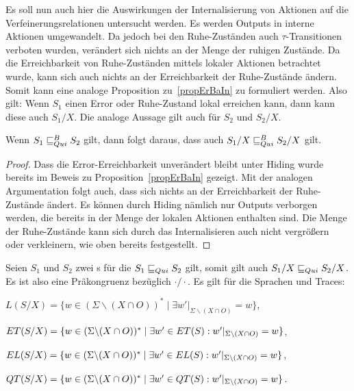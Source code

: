 Es soll nun auch hier die Auswirkungen der Internalisierung von Aktionen auf
die Verfeinerungsrelationen untersucht werden. Es werden Outputs in interne
Aktionen umgewandelt. Da jedoch bei den Ruhe-Zuständen auch
$\tau$-Transitionen verboten wurden, verändert sich nichts an der Menge der
ruhigen Zustände. Da die Erreichbarkeit von Ruhe-Zuständen mittels lokaler
Aktionen betrachtet wurde, kann sich auch nichts an der Erreichbarkeit der
Ruhe-Zustände ändern. Somit kann eine analoge Proposition zu~\ref{propErBaIn}
zu formuliert werden. Also gilt: Wenn $S_1$ einen Error oder Ruhe-Zustand lokal
erreichen kann, dann kann diese auch $S_1/X$. Die analoge Aussage gilt auch für
$S_2$ und $S_2/X$.

\begin{prop}
  Wenn $S_1\sqsubseteq _{Qui}^B S_2$ gilt, dann folgt daraus, dass auch $S_1/X\sqsubseteq _{Qui}^B S_2/X$
  gilt.
\end{prop}

\begin{proof}
  Dass die Error-Erreichbarkeit unverändert bleibt unter Hiding wurde bereits
  im Beweis zu Proposition~\ref{propErBaIn} gezeigt. Mit der analogen
  Argumentation folgt auch, dass sich nichts an der Erreichbarkeit der
  Ruhe-Zustände ändert. Es können durch Hiding nämlich nur Outputs verborgen
  werden, die bereits in der Menge der lokalen Aktionen enthalten sind. Die
  Menge der Ruhe-Zustände kann sich durch das Internalisieren auch nicht
  vergrößern oder verkleinern, wie oben bereits festgestellt.
\end{proof}

\begin{satz}
  \label{satzPraeInterQui}
  Seien $S_1$ und $S_2$ zwei \EIO{}s für die $S_1\sqsubseteq _{Qui} S_2$ gilt, somit gilt
  auch $S_1/X\sqsubseteq _{Qui} S_2/X$. Es ist also \QRel{} eine Präkongruenz bezüglich
  $\cdot /\cdot$. Es gilt für die Sprachen und Traces:
  \begin{compactenum}[(i)]
    \item $L(S/X) = \{w\in (\Sigma\backslash(X\cap O))^*\mid \exists
      w'|_{\Sigma\backslash (X\cap O)} = w\}$,
    \item $ET{}(S/X) = \{w\in (\Sigma\backslash (X\cap O))^*\mid \exists
      w'\in ET{}(S): w'|_{\Sigma\backslash (X\cap O)} = w\}$,
    \item $EL{}(S/X) = \{w\in (\Sigma\backslash (X\cap O))^*\mid \exists w'\in
      EL(S): w'|_{\Sigma\backslash (X\cap O)} = w\}$,
    \item $QT{}(S/X) = \{w\in (\Sigma\backslash (X\cap O))^*\mid \exists w'\in
      QT{}(S):w'|_{\Sigma\backslash (X\cap O)}=w\}$.
  \end{compactenum}
\end{satz}

